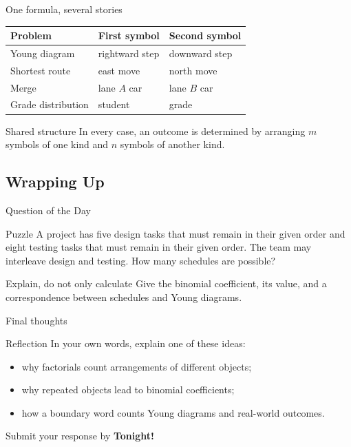 \documentclass{beamer}
\begin{document}
\begin{frame}{One formula, several stories}
  \begin{center}
    \begin{tabular}{l|l|l}
      Problem & First symbol & Second symbol \\
      \hline
      Young diagram & rightward step & downward step \\
      Shortest route & east move & north move \\
      Merge & lane $A$ car & lane $B$ car \\
      Grade distribution & student & grade
    \end{tabular}
  \end{center}
\pause
  \begin{block}{Shared structure}
    In every case, an outcome is determined by arranging $m$ symbols of one
    kind and $n$ symbols of another kind.
  \end{block}
\end{frame}

\subsection{Wrapping Up}

\begin{frame}{Question of the Day}
  \begin{block}{Puzzle}
    A project has five design tasks that must remain in their given order and
    eight testing tasks that must remain in their given order.  The team may
    interleave design and testing.  How many schedules are possible?
  \end{block}
\pause
  \begin{block}{Explain, do not only calculate}
    Give the binomial coefficient, its value, and a correspondence between
    schedules and Young diagrams.
  \end{block}
\end{frame}

\begin{frame}{Final thoughts}
  \begin{block}{Reflection}
    In your own words, explain one of these ideas:
    \begin{itemize}
\pause
      \item why factorials count arrangements of different objects;
\pause
      \item why repeated objects lead to binomial coefficients;
\pause
      \item how a boundary word counts Young diagrams and real-world outcomes.
    \end{itemize}
  \end{block}
  \begin{center}
    Submit your response by \textbf{Tonight!}
  \end{center}
\end{frame}
\end{document}
